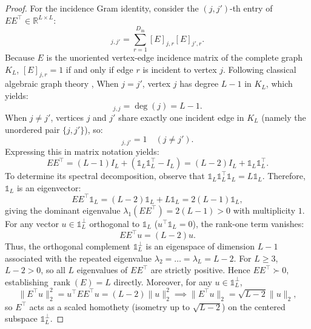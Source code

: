 \documentclass[default,sn-mathphys,Numbered]{sn-jnl}
\theoremstyle{thmstyleone}
\theoremstyle{thmstylethree}
\theoremstyle{thmstyletwo}
\newcommand{\inp}{\text{in}}
\newcommand{\rank}{\operatorname{rank}}
\begin{document}
\begin{appendices}
\begin{proof}
For the incidence Gram identity, consider the $(j, j')$-th entry of $E E^\top \in \mathbb{R}^{L \times L}$:
\begin{equation}
[E E^\top]_{j, j'} = \sum_{r=1}^{D_{\inp}} [E]_{j, r} [E]_{j', r}.
\end{equation}
Because $E$ is the unoriented vertex-edge incidence matrix of the complete graph $K_L$, $[E]_{j, r} = 1$ if and only if edge $r$ is incident to vertex $j$. Following classical algebraic graph theory \citep{godsil2001algebraic},
When $j = j'$, vertex $j$ has degree $L - 1$ in $K_L$, which yields:
\begin{equation}
[E E^\top]_{j, j} = \operatorname{deg}(j) = L - 1.
\end{equation}
When $j \neq j'$, vertices $j$ and $j'$ share exactly one incident edge in $K_L$ (namely the unordered pair $\{j, j'\}$), so:
\begin{equation}
[E E^\top]_{j, j'} = 1 \quad (j \neq j').
\end{equation}
Expressing this in matrix notation yields:
\begin{equation}
E E^\top = (L - 1) I_L + (\mathds{1}_L \mathds{1}_L^\top - I_L) = (L - 2) I_L + \mathds{1}_L \mathds{1}_L^\top.
\end{equation}
To determine its spectral decomposition, observe that $\mathds{1}_L \mathds{1}_L^\top \mathds{1}_L = L \mathds{1}_L$. Therefore, $\mathds{1}_L$ is an eigenvector:
\begin{equation}
E E^\top \mathds{1}_L = (L - 2) \mathds{1}_L + L \mathds{1}_L = 2(L - 1) \mathds{1}_L,
\end{equation}
giving the dominant eigenvalue $\lambda_1(E E^\top) = 2(L - 1) > 0$ with multiplicity $1$.
For any vector $u \in \mathds{1}_L^\perp$ orthogonal to $\mathds{1}_L$ ($u^\top \mathds{1}_L = 0$), the rank-one term vanishes:
\begin{equation}
E E^\top u = (L - 2) u.
\end{equation}
Thus, the orthogonal complement $\mathds{1}_L^\perp$ is an eigenspace of dimension $L - 1$ associated with the repeated eigenvalue $\lambda_2 = \dots = \lambda_L = L - 2$.
For $L \ge 3$, $L - 2 > 0$, so all $L$ eigenvalues of $E E^\top$ are strictly positive. Hence $E E^\top \succ 0$, establishing $\rank(E) = L$ directly. Moreover, for any $u \in \mathds{1}_L^\perp$,
\begin{equation}
\|E^\top u\|_2^2 = u^\top E E^\top u = (L - 2) \|u\|_2^2 \implies \|E^\top u\|_2 = \sqrt{L - 2} \|u\|_2,
\end{equation}
so $E^\top$ acts as a scaled homothety (isometry up to $\sqrt{L - 2}$) on the centered subspace $\mathds{1}_L^\perp$.


\end{proof}
\end{appendices}
\end{document}
